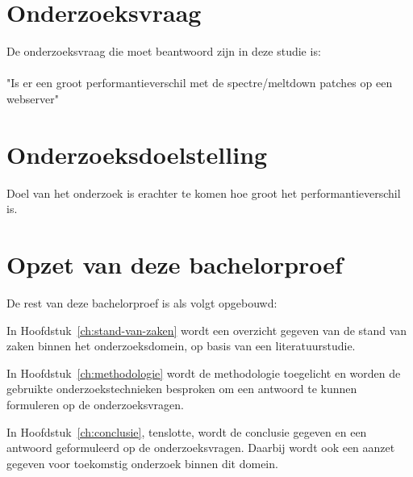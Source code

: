 \section{Onderzoeksvraag}
\label{sec:onderzoeksvraag}


De onderzoeksvraag die moet beantwoord zijn in deze studie is: \\ \\ "Is er een groot performantieverschil met de spectre/meltdown patches op een webserver"


\section{Onderzoeksdoelstelling}
\label{sec:onderzoeksdoelstelling}


Doel van het onderzoek is erachter te komen hoe groot het performantieverschil is. 

\section{Opzet van deze bachelorproef}
\label{sec:opzet-bachelorproef}


De rest van deze bachelorproef is als volgt opgebouwd:

In Hoofdstuk~\ref{ch:stand-van-zaken} wordt een overzicht gegeven van de stand van zaken binnen het onderzoeksdomein, op basis van een literatuurstudie.

In Hoofdstuk~\ref{ch:methodologie} wordt de methodologie toegelicht en worden de gebruikte onderzoekstechnieken besproken om een antwoord te kunnen formuleren op de onderzoeksvragen.


In Hoofdstuk~\ref{ch:conclusie}, tenslotte, wordt de conclusie gegeven en een antwoord geformuleerd op de onderzoeksvragen. Daarbij wordt ook een aanzet gegeven voor toekomstig onderzoek binnen dit domein.


